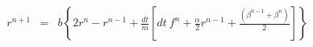 \documentclass[24pt]{article}
\begin{document}
\begin{eqnarray*}
r^{n+1}  &=& b \left \{ 2r^n - r^{n-1} + \frac{dt}{m} \left [ dt~f^n + \frac{\alpha}{2} r^{n-1} + \frac{(\beta^{n-1}+\beta^n)}{2} \right ] \right \} \\
\end{eqnarray*}
\end{document}
